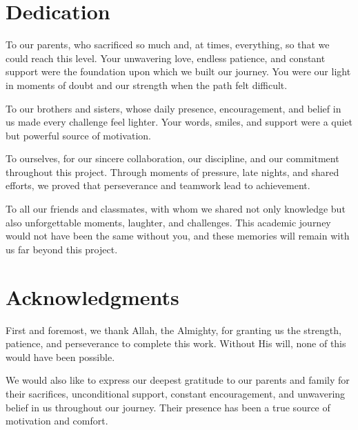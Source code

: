 \documentclass[12pt,a4paper]{report}
\begin{document}


\hypersetup{pageanchor=false}

\chapter*{Dedication}

To our parents, who sacrificed so much and, at times, everything, so that we could reach this
level. Your unwavering love, endless patience, and constant support were the foundation upon
which we built our journey. You were our light in moments of doubt and our strength when the
path felt difficult.

To our brothers and sisters, whose daily presence, encouragement, and belief in us made every
challenge feel lighter. Your words, smiles, and support were a quiet but powerful source of
motivation.

To ourselves, for our sincere collaboration, our discipline, and our commitment throughout this
project. Through moments of pressure, late nights, and shared efforts, we proved that
perseverance and teamwork lead to achievement.

To all our friends and classmates, with whom we shared not only knowledge but also unforgettable
moments, laughter, and challenges. This academic journey would not have been the same without
you, and these memories will remain with us far beyond this project.

\chapter*{Acknowledgments}

First and foremost, we thank Allah, the Almighty, for granting us the strength, patience, and
perseverance to complete this work. Without His will, none of this would have been possible.

We would also like to express our deepest gratitude to our parents and family for their
sacrifices, unconditional support, constant encouragement, and unwavering belief in us
throughout our journey. Their presence has been a true source of motivation and comfort.
\end{document}
